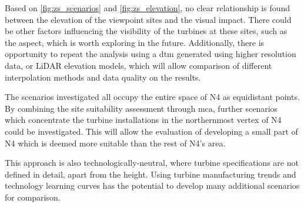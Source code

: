 Based on \autoref{fig:zs_scenarios} and \autoref{fig:zs_elevation}, no clear
relationship is found between the elevation of the viewpoint sites and the
visual impact. There could be other factors influencing the visibility of the
turbines at these sites, such as the aspect, which is worth exploring in the
future. Additionally, there is opportunity to repeat the analysis using a
\gls{dtm} generated using higher resolution data, or LiDAR elevation models,
which will allow comparison of different interpolation methods and data quality
on the results.

The scenarios investigated all occupy the entire space of N4 as equidistant
points. By combining the site suitability assessment through \gls{mca}, further
scenarios which concentrate the turbine installations in the northernmost
vertex of N4 could be investigated. This will allow the evaluation of
developing a small part of N4 which is deemed more suitable than the rest of
N4's area.

This approach is also technologically-neutral, where turbine specifications are
not defined in detail, apart from the height. Using turbine manufacturing
trends and technology learning curves has the potential to develop many
additional scenarios for comparison.
